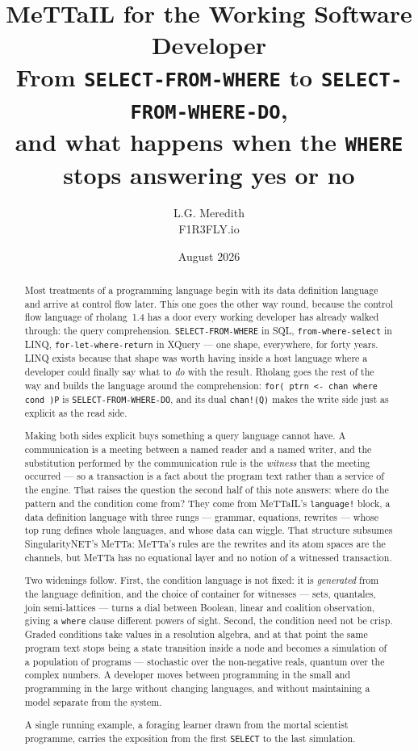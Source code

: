 \documentclass[11pt]{article}
\title{\bf MeTTaIL for the Working Software Developer\\[2mm]
\large From \texttt{SELECT-FROM-WHERE} to \texttt{SELECT-FROM-WHERE-DO},\\
\large and what happens when the \texttt{WHERE} stops answering yes or no}
\author{L.G. Meredith\\ \small F1R3FLY.io}
\date{August 2026}
\theoremstyle{definition}
\theoremstyle{plain}
\theoremstyle{remark}
\begin{document}
\maketitle

\begin{abstract}
\noindent
Most treatments of a programming language begin with its data definition language
and arrive at control flow later. This one goes the other way round, because the
control flow language of rholang~1.4 has a door every working developer has
already walked through: the query comprehension. \texttt{SELECT-FROM-WHERE} in SQL,
\texttt{from-where-select} in LINQ, \texttt{for-let-where-return} in XQuery --- one
shape, everywhere, for forty years. LINQ exists because that shape was worth
having inside a host language where a developer could finally say what to
\emph{do} with the result. Rholang goes the rest of the way and builds the
language around the comprehension: \texttt{for( ptrn <- chan where cond )P} is
\texttt{SELECT-FROM-WHERE-DO}, and its dual \texttt{chan!(Q)} makes the write
side just as explicit as the read side.

Making both sides explicit buys something a query language cannot have. A
communication is a meeting between a named reader and a named writer, and the
substitution performed by the communication rule is the \emph{witness} that the
meeting occurred --- so a transaction is a fact about the program text rather
than a service of the engine. That raises the question the second half of this
note answers: where do the pattern and the condition come from? They come from
MeTTaIL's \texttt{language!} block, a data definition language with three rungs
--- grammar, equations, rewrites --- whose top rung defines whole languages, and
whose data can wiggle. That structure subsumes SingularityNET's MeTTa: MeTTa's
rules are the rewrites and its atom spaces are the channels, but MeTTa has no
equational layer and no notion of a witnessed transaction.

Two widenings follow. First, the condition language is not fixed: it is
\emph{generated} from the language definition, and the choice of container for
witnesses --- sets, quantales, join semi-lattices --- turns a dial between
Boolean, linear and coalition observation, giving a \texttt{where} clause
different powers of sight. Second, the condition need not be crisp. Graded
conditions take values in a resolution algebra, and at that point the same
program text stops being a state transition inside a node and becomes a
simulation of a population of programs --- stochastic over the non-negative
reals, quantum over the complex numbers. A developer moves between programming
in the small and programming in the large without changing languages, and
without maintaining a model separate from the system.

A single running example, a foraging learner drawn from the mortal scientist
programme, carries the exposition from the first \texttt{SELECT} to the last
simulation.
\end{abstract}
\end{document}
